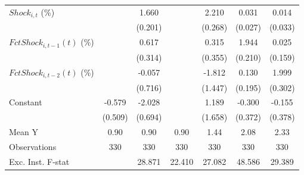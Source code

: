 {\begin{tabular}{l*{6}{c}}
\addlinespace
$ Shock_{i,t}$ (\%) &                     &       1.660\sym{***}&                     &       2.210\sym{***}&       0.031         &       0.014         \\
                    &                     &     (0.201)         &                     &     (0.268)         &     (0.027)         &     (0.033)         \\
\addlinespace
$ FctShock_{i,t-1}(t)$ (\%)&                     &       0.617\sym{*}  &                     &       0.315         &       1.944\sym{***}&       0.025         \\
                    &                     &     (0.314)         &                     &     (0.355)         &     (0.210)         &     (0.159)         \\
\addlinespace
$ FctShock_{i,t-2}(t)$ (\%)&                     &      -0.057         &                     &      -1.812         &       0.130         &       1.999\sym{***}\\
                    &                     &     (0.716)         &                     &     (1.447)         &     (0.195)         &     (0.302)         \\
\addlinespace
Constant            &      -0.579         &      -2.028\sym{***}&                     &       1.189         &      -0.300         &      -0.155         \\
                    &     (0.509)         &     (0.694)         &                     &     (1.658)         &     (0.372)         &     (0.378)         \\
\midrule
Mean Y              &        0.90         &        0.90         &        0.90         &        1.44         &        2.08         &        2.33         \\
Observations        &         330         &         330         &         330         &         330         &         330         &         330         \\
Exc. Inst. F-stat   &                     &      28.871         &      22.410         &      27.082         &      48.586         &      29.389         \\
\bottomrule
\end{tabular}
}
